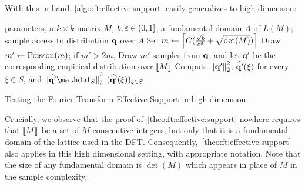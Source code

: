 With this in hand, \cref{algo:ft:effective:support} easily generalizes to high dimension:
\begin{algorithm}
  \begin{algorithmic}[1]
    \Require parameters, a $k \times k$ matrix $M$, $b,\varepsilon\in(0,1]$; a fundamental domain $A$ of $L(M)$; sample access to distribution $\mathbf{q}$ over $A$
    \State\label{algo:ft:pmd:step:choosemprime} Set $m\gets \left\lceil C(\frac{\sqrt{b}}{\varepsilon^2}+ \sqrt{\det(M)}) \right\rceil$ 
    \State Draw $m'\gets \operatorname{Poisson}\!\left( m \right) $; if $m'>2m$, \Return \reject
    \State\label{algo:ft:pmd:step:empr} Draw $m'$ samples from $\mathbf{q}$, and let $\mathbf{q}'$ be the corresponding empirical distribution over $\llbracket M\rrbracket$
    \State\label{algo:ft:pmd:step:norm} Compute ${\lVert\mathbf{q}'{\rVert}}_2^2$, $\widehat{\mathbf{q}'}(\xi)$ for every $\xi\in S$, and $\normtwo{\fourier{\q'}\indicSet{S}}^2$ 
    \label{algo:ft:pmd:step:norm:check} \Return \reject
     \Return \reject
    \Else
      \State \Return $(\widehat{\mathbf{q}'}(\xi))_{\xi\in S}$
    \EndIf
  \end{algorithmic}
  \caption{Testing the Fourier Transform Effective Support in high dimension}\label{algo:ft:pmd:effective:support:high-dim}
\end{algorithm}

Crucially, we observe that the proof of~\cref{theo:ft:effective:support} nowhere requires that $\llbracket M\rrbracket$ be a set of $M$ consecutive integers, but only that it is a fundamental domain of the lattice used in the DFT. Consequently,~\cref{theo:ft:effective:support} also applies in this high dimensional setting, with appropriate notation. Note that the size of any fundamental domain is $\det(M)$ which appears in place of $M$ in the sample complexity.

